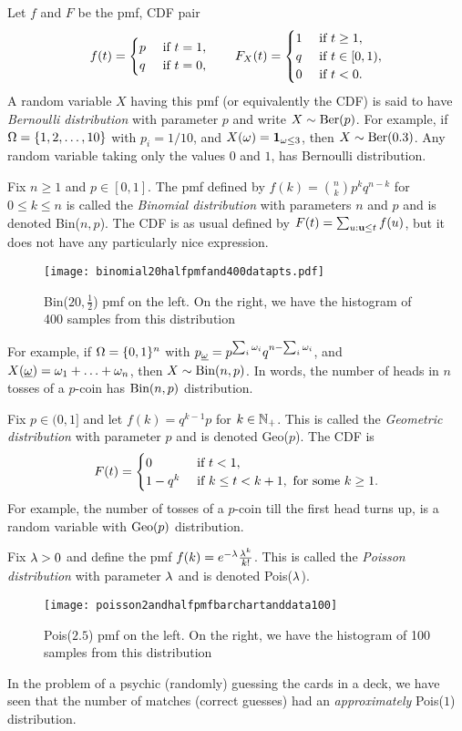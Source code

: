 \documentclass[preprint,  11pt]{amsart}
\def\omeg{\underline{\ome}}
\begin{document}
\beg Let $f$ and $F$ be the pmf, CDF pair 
$$
f(t)=\begin{cases}p & \mbox{ if }t=1, \\ q & \mbox{ if }t=0, \end{cases} \qquad F_{X}(t)=\begin{cases} 1 &\mbox{ if } t\ge 1, \\ q & \mbox{ if }t\in [0,1), \\ 0 & \mbox{ if }t< 0. \end{cases}
$$ 
A random variable $X$ having this pmf (or equivalently the CDF) is said to have {\em Bernoulli distribution} with parameter $p$ and  write $X\sim \mbox{Ber}(p)$. For example, if $\Omega=\{1,2,\ldots ,10\}$ with $p_{i}=1/10$, and $X(\omega)={\mathbf 1}_{\omega\le 3}$, then $X\sim \mbox{Ber}(0.3)$. Any random variable taking only the values $0$ and $1$, has Bernoulli distribution.
\eeg

\beg  Fix $n\ge 1$ and $p\in [0,1]$. The pmf defined by $f(k)=\binom{n}{k}p^{k}q^{n-k}$ for $0\le k\le n$ is called the {\em Binomial  distribution} with parameters $n$ and $p$ and is denoted Bin($n,p$). The CDF is as usual defined by $F(t)=\sum_{u:\mathbf{u}\le t}f(u)$, but it does not have any particularly nice expression. 
\begin{figure}
\texttt{[image: binomial20halfpmfand400datapts.pdf]}
\caption{Bin($20,\frac12$) pmf on the left. On the right, we have the histogram of 400 samples from this distribution}
\end{figure}



For example, if $\Omega=\{0,1\}^{n}$ with $p_{\omeg}=p^{\sum_{i}\ome_{i}}q^{n-\sum_{i}\ome_{i}}$, and $X(\omeg)=\ome_{1}+\ldots +\ome_{n}$, then $X\sim \mbox{Bin}(n,p)$. In words, the number of heads in $n$ tosses of a $p$-coin has $\mbox{Bin}(n,p)$ distribution.
\eeg

\beg Fix $p\in (0,1]$ and let $f(k)=q^{k-1}p$ for $k\in \mathbb{N}_{+}$. This is called the {\em Geometric  distribution} with parameter $p$ and is denoted Geo($p$). The CDF is
$$
F(t) = \begin{cases}
0 & \mbox{ if } t<1, \\
1-q^{k} & \mbox{ if } k\le t<k+1, \mbox{ for some }k\ge 1.
\end{cases}
$$
For example, the number of tosses of a $p$-coin till the first head turns up, is a random variable with $\mbox{Geo}(p)$ distribution.
\eeg 

\beg Fix $\lambda>0$ and define the pmf $f(k)=e^{-\lambda}\frac{\lambda^{k}}{k!}$. This is called the {\em Poisson  distribution} with parameter $\lambda$ and is denoted Pois($\lambda$).
\begin{figure}
\texttt{[image: poisson2andhalfpmfbarchartanddata100]}
\caption{Pois($2.5$) pmf on the left. On the right, we have the histogram of 100 samples from this distribution}
\end{figure}
In the problem of a psychic (randomly) guessing the cards in a deck, we have seen that the number of matches (correct guesses) had an {\em approximately} Pois($1$) distribution.
\eeg
\end{document}
